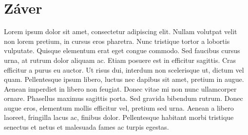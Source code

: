 \chapter*{Záver}
Lorem ipsum dolor sit amet, consectetur adipiscing elit. Nullam volutpat velit non lorem pretium, in cursus eros pharetra. Nunc tristique tortor a lobortis vulputate. Quisque elementum erat eget congue commodo. Sed faucibus cursus urna, at rutrum dolor aliquam ac. Etiam posuere est in efficitur sagittis. Cras efficitur a purus eu auctor. Ut risus dui, interdum non scelerisque ut, dictum vel quam. Pellentesque ipsum libero, luctus nec dapibus sit amet, pretium in augue. Aenean imperdiet in libero non feugiat. Donec vitae mi non nunc ullamcorper ornare. Phasellus maximus sagittis porta. Sed gravida bibendum rutrum. Donec augue eros, elementum mollis efficitur vel, pretium sed urna. Aenean a libero laoreet, fringilla lacus ac, finibus dolor. Pellentesque habitant morbi tristique senectus et netus et malesuada fames ac turpis egestas.
